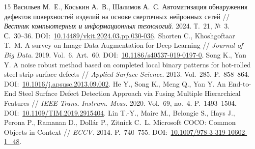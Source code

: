 \documentclass{misisarticle}
\begin{document}
\begin{thebibliography}{15}
 Васильев М.~Е., Коськин А.~В., Шалимов А.~С. Автоматизация обнаружения дефектов поверхностей изделий на основе сверточных нейронных сетей // \textit{Вестник компьютерных и информационных технологий}. 2024. Т.~21, №~3. С.~30--36. DOI:~\href{https://doi.org/10.14489/vkit.2024.03.pp.030-036}{10.14489/vkit.2024.03.pp.030-036}.
 Shorten C., Khoshgoftaar T.~M. A survey on Image Data Augmentation for Deep Learning // \textit{Journal of Big Data}. 2019. Vol.~6. Art.~60. DOI:~\href{https://doi.org/10.1186/s40537-019-0197-0}{10.1186/s40537-019-0197-0}.
 Song K., Yan Y. A noise robust method based on completed local binary patterns for hot-rolled steel strip surface defects // \textit{Applied Surface Science}. 2013. Vol.~285. P.~858--864. DOI:~\href{https://doi.org/10.1016/j.apsusc.2013.09.002}{10.1016/j.apsusc.2013.09.002}.
 He Y., Song K., Meng Q., Yan Y. An End-to-End Steel Surface Defect Detection Approach via Fusing Multiple Hierarchical Features // \textit{IEEE Trans. Instrum. Meas.} 2020. Vol.~69, no.~4. P.~1493--1504. DOI:~\href{https://doi.org/10.1109/TIM.2019.2915404}{10.1109/TIM.2019.2915404}.
 Lin T.-Y., Maire M., Belongie S., Hays J., Perona P., Ramanan D., Dollár P., Zitnick C.~L. Microsoft COCO: Common Objects in Context // \textit{ECCV}. 2014. P.~740--755. DOI:~\href{https://doi.org/10.1007/978-3-319-10602-1_48}{10.1007/978-3-319-10602-1\_48}.
\end{thebibliography}
\end{document}
